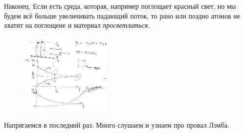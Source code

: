 Наконец. Если есть среда, которая, например поглощает красный свет, но мы будем всё больше увеличивать падающий поток, то рано или поздно атомов не хватит на поглощене и материал \textit{просветлиться}.
\begin{figure}[h]
    \centering
    \includegraphics[width=0.4\textwidth]{img/lec_6_zerg.png}
\end{figure}


Напрягаемся в последний раз. Много слушаем и узнаем про провал Лэмба.
